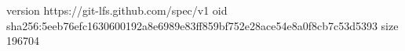 version https://git-lfs.github.com/spec/v1
oid sha256:5eeb76efc1630600192a8e6989e83ff859bf752e28ace54e8a0f8cb7c53d5393
size 196704

